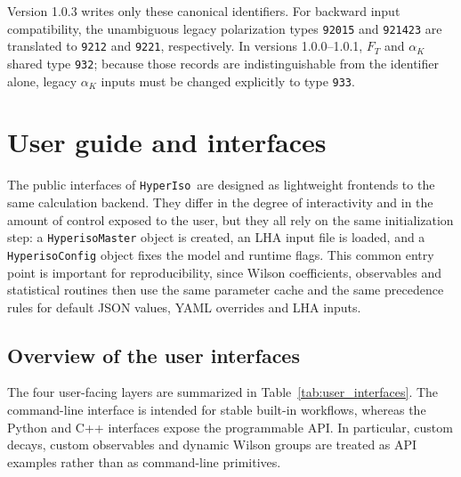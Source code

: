 \documentclass[preprint,11pt]{elsarticle}
\newcommand{\hi}{\texttt{HyperIso}}
\begin{document}
Version 1.0.3 writes only these canonical identifiers. For backward input compatibility, the unambiguous legacy polarization types \texttt{92015} and \texttt{921423} are translated to \texttt{9212} and \texttt{9221}, respectively. In versions 1.0.0--1.0.1, $F_T$ and $\alpha_K$ shared type \texttt{932}; because those records are indistinguishable from the identifier alone, legacy $\alpha_K$ inputs must be changed explicitly to type \texttt{933}.

\section{User guide and interfaces}\label{sec:user_guide}

The public interfaces of \hi~are designed as lightweight frontends to the same calculation backend. They differ in the degree of interactivity and in the amount of control exposed to the user, but they all rely on the same initialization step: a \texttt{HyperisoMaster} object is created, an LHA input file is loaded, and a \texttt{HyperisoConfig} object fixes the model and runtime flags. This common entry point is important for reproducibility, since Wilson coefficients, observables and statistical routines then use the same parameter cache and the same precedence rules for default JSON values, YAML overrides and LHA inputs.

\subsection{Overview of the user interfaces}

The four user-facing layers are summarized in Table~\ref{tab:user_interfaces}. The command-line interface is intended for stable built-in workflows, whereas the Python and C++ interfaces expose the programmable API. In particular, custom decays, custom observables and dynamic Wilson groups are treated as API examples rather than as command-line primitives.
\end{document}
